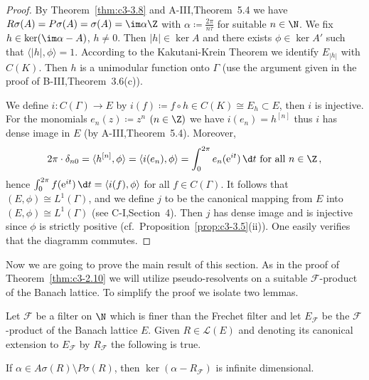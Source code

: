 	\begin{proof}
		By Theorem~\ref{thm:c3-3.8} and A-III,Theorem~5.4 we have $R\sigma(A) = P\sigma(A) = \sigma(A) = \im\alpha\Z$ with $\alpha \coloneqq \frac{2\pi}{n\tau}$ for suitable $n \in \N$.
		We fix $h \in \ker(\im\alpha - A)$, $h \neq 0$.
		Then $|h| \in \ker A$ and there exists $\phi \in \ker A'$ such that $\langle|h|,\phi\rangle = 1$.
		According to the Kakutani-Krein Theorem we identify $E_{|h|}$ with $C(K)$.
		Then $h$ is a unimodular function onto $\Gamma$ (use the argument given in the proof of B-III,Theorem~3.6(c)).
		
		We define $i \colon C(\Gamma) \to E$ by $i(f) \coloneqq f\circ h \in C(K) \cong E_{h} \subset E$, then $i$ is injective.
		For the monomials $e_{n}(z) \coloneqq z^{n}$ $(n \in \Z)$ we have $i(e_{n}) = h^{[n]}$ thus $i$ has dense image in $E$ (by A-III,Theorem~5.4).
		Moreover, 
		\[
		2\pi\cdot\delta_{n0} = \langle h^{[n]},\phi\rangle = \langle i(e_{n}),\phi\rangle = \int_{0}^{2\pi} e_{n}(\mathrm{e}^{it})\,\d t \text{ for all } n \in \Z\,,
		\] 
		hence $\int_{0}^{2\pi} f(\mathrm{e}^{it})\,\d t  = \langle i(f),\phi\rangle$ for all $f \in C(\Gamma)$.
		It follows that $(E,\phi) \cong L^{1}(\Gamma)$, and we define $j$ to be the canonical mapping from $E$ into $(E,\phi) \cong L^{1}(\Gamma)$ (see C-I,Section~4).
		Then $j$ has dense image and is injective since $\phi$ is strictly positive (cf.\ Proposition~\ref{prop:c3-3.5}(ii)).
		One easily verifies that the diagramm commutes.
	\end{proof}
%
%
Now we are going to prove the main result of this section.
As in the proof of Theorem~\ref{thm:c3-2.10} we will utilize pseudo-resolvents on a suitable $\mathcal{F}$-product of the Banach lattice.
To simplify the proof we isolate two lemmas.

\begin{lemma}\label{lem:c3-3.10}
	
	Let $\mathcal{F}$ be a filter on $\N$ which is finer than the Frechet filter and let $E_{\mathcal{F}}$ be the $\mathcal{F}$-product of the Banach lattice $E$.
	Given $R \in \mathcal{L}(E)$ and denoting its canonical extension to $E_{\mathcal{F}}$ by $R_{\mathcal{F}}$ the following is true.
	
	If $\alpha \in A\sigma(R)\setminus P\sigma(R)$, then $\ker(\alpha - R_{\mathcal{F}})$ is infinite dimensional.
\end{lemma}
	
